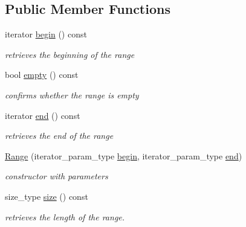 \subsection*{Public Member Functions}
\begin{DoxyCompactItemize}
\item 
\hypertarget{classhryky_1_1_range_aaa45d0481e79fb4d22ec8f048fa23086}{iterator \hyperlink{classhryky_1_1_range_aaa45d0481e79fb4d22ec8f048fa23086}{begin} () const }\label{classhryky_1_1_range_aaa45d0481e79fb4d22ec8f048fa23086}

\begin{DoxyCompactList}\small\item\em retrieves the beginning of the range \end{DoxyCompactList}\item 
\hypertarget{classhryky_1_1_range_a4a5a9552aa2ddadbac3904bd90fa3ea8}{bool \hyperlink{classhryky_1_1_range_a4a5a9552aa2ddadbac3904bd90fa3ea8}{empty} () const }\label{classhryky_1_1_range_a4a5a9552aa2ddadbac3904bd90fa3ea8}

\begin{DoxyCompactList}\small\item\em confirms whether the range is empty \end{DoxyCompactList}\item 
\hypertarget{classhryky_1_1_range_a202ec210efd7e9cb9a22b2e98ab21107}{iterator \hyperlink{classhryky_1_1_range_a202ec210efd7e9cb9a22b2e98ab21107}{end} () const }\label{classhryky_1_1_range_a202ec210efd7e9cb9a22b2e98ab21107}

\begin{DoxyCompactList}\small\item\em retrieves the end of the range \end{DoxyCompactList}\item 
\hypertarget{classhryky_1_1_range_ae63ff553300d8c509419fcbae9b6f95d}{\hyperlink{classhryky_1_1_range_ae63ff553300d8c509419fcbae9b6f95d}{Range} (iterator\-\_\-param\-\_\-type \hyperlink{classhryky_1_1_range_aaa45d0481e79fb4d22ec8f048fa23086}{begin}, iterator\-\_\-param\-\_\-type \hyperlink{classhryky_1_1_range_a202ec210efd7e9cb9a22b2e98ab21107}{end})}\label{classhryky_1_1_range_ae63ff553300d8c509419fcbae9b6f95d}

\begin{DoxyCompactList}\small\item\em constructor with parameters \end{DoxyCompactList}\item 
\hypertarget{classhryky_1_1_range_a38820cf89240d336b89648f5ec9948ad}{size\-\_\-type \hyperlink{classhryky_1_1_range_a38820cf89240d336b89648f5ec9948ad}{size} () const }\label{classhryky_1_1_range_a38820cf89240d336b89648f5ec9948ad}

\begin{DoxyCompactList}\small\item\em retrieves the length of the range. \end{DoxyCompactList}\end{DoxyCompactItemize}


